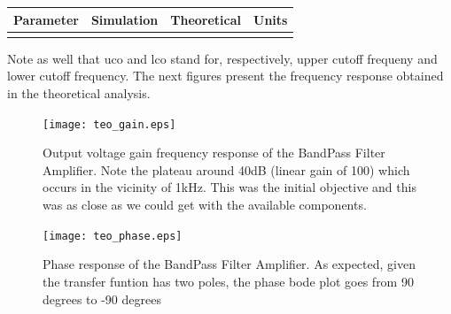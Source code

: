 \hfill
 \parbox{1\linewidth}{
  \centering
  \begin{tabular}{|l|l|l|r|}
    \hline    
    {\bf Parameter} & {\bf Simulation} & {\bf Theoretical } & {\bf Units }\\ \hline
    
  \label{tab:results}
  \end{tabular}
  }
  
  Note as well that uco and lco stand for, respectively, upper cutoff frequeny and lower cutoff frequency.
  The next figures present the frequency response obtained in the theoretical analysis.


\begin{figure}[H] \centering
\texttt{[image: teo\_gain.eps]}
\caption{Output voltage gain frequency response of the BandPass Filter Amplifier. Note the plateau around 40dB (linear gain of 100) which occurs in the vicinity of 1kHz. This was the initial objective and this was as close as we could get with the available components.}
\label{fig:gain_octa}
\end{figure}

\begin{figure}[H] \centering
\texttt{[image: teo\_phase.eps]}
\caption{Phase response of the BandPass Filter Amplifier. As expected, given the transfer funtion has two poles, the phase bode plot goes from 90 degrees to -90 degrees}
\label{fig:phase_octa}
\end{figure}



\pagebreak


